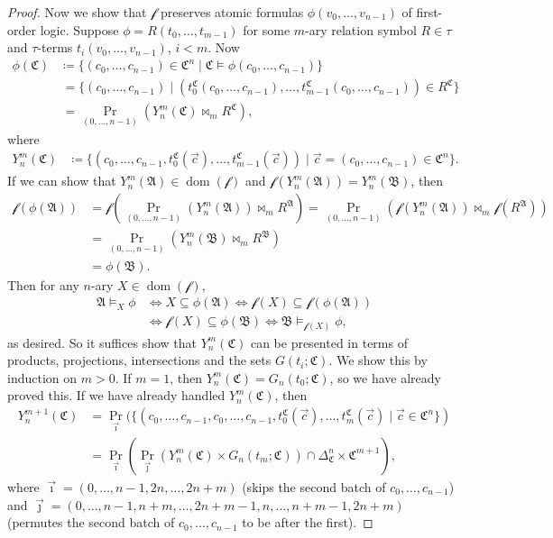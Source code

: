 \documentclass[a4paper]{amsart}
\theoremstyle{definition}
\theoremstyle{remark}
\newcommand{\A}{\mathcal{A}}
\newcommand{\B}{\mathcal{B}}
\newcommand{\C}{\mathcal{C}}
\DeclareMathOperator{\dom}{dom}
\theoremstyle{definition}
\renewcommand{\A}{\mathfrak{A}}
\renewcommand{\B}{\mathfrak{B}}
\renewcommand{\C}{\mathfrak{C}}
\newcommand{\f}{\mathcal{f}}
\begin{document}
\begin{proof}
    Now we show that $\f$ preserves atomic formulas $\phi(v_0,\dots,v_{n-1})$ of first-order logic. Suppose $\phi = R(t_0,\dots,t_{m-1})$ for some $m$-ary relation symbol $R\in\tau$ and $\tau$-terms $t_i(v_0,\dots,v_{n-1})$, $i<m$. Now
    \begin{align*}
        \phi(\C) &\coloneqq \{ (c_0,\dots,c_{n-1})\in\C^n \mid \C\models\phi(c_0,\dots,c_{n-1}) \} \\
        &\,= \{ (c_0,\dots,c_{n-1}) \mid (t_0^\C(c_0,\dots,c_{n-1}),\dots,t_{m-1}^\C(c_0,\dots,c_{n-1}))\in R^\C \} \\
        &\,= \Pr_{(0,\dots,n-1)}( Y^m_n(\C) \bowtie_m R^\C ),
    \end{align*}
    where
    \begin{align*}
        Y^m_n(\C) &\coloneqq \{ (c_0,\dots,c_{n-1},t_0^\C(\vec c),\dots,t_{m-1}^\C(\vec c)) \mid \vec c = (c_0,\dots,c_{n-1})\in\C^n \}.
    \end{align*}
    If we can show that $Y^m_n(\A)\in\dom(\f)$ and $\f(Y^m_n(\A)) = Y^m_n(\B)$, then
    \begin{align*}
        \f(\phi(\A)) &= \f\left( \Pr_{(0,\dots,n-1)}(Y^m_n(\A))\bowtie_m R^\A \right) = \Pr_{(0,\dots,n-1)}( \f(Y^m_n(\A))\bowtie_m\f(R^\A) ) \\
        &= \Pr_{(0,\dots,n-1)}(Y^m_n(\B)\bowtie_m R^\B) \\
        &= \phi(\B).
    \end{align*}
    Then for any $n$-ary $X\in\dom(\f)$,
    \begin{align*}
        \A\models_X\phi &\iff X\subseteq\phi(\A) \iff \f(X) \subseteq \f(\phi(\A)) \\
        &\iff \f(X) \subseteq\phi(\B) \iff \B\models_{\f(X)}\phi,
    \end{align*}
    as desired. So it suffices show that $Y^m_n(\C)$ can be presented in terms of products, projections, intersections and the sets $G(t_i;\C)$. We show this by induction on $m>0$. If $m=1$, then $Y^m_n(\C) = G_n(t_0;\C)$, so we have already proved this. If we have already handled $Y^m_n(\C)$, then
    \begin{align*}
        Y^{m+1}_n(\C) &= \Pr_{\vec\imath}(\{(c_0,\dots,c_{n-1},c_0,\dots,c_{n-1},t_0^\C(\vec c),\dots,t_m^\C(\vec c) \mid \vec c\in\C^n\}) \\
        &= \Pr_{\vec\imath}(\Pr_{\vec\jmath}(Y^m_n(\C)\times G_n(t_m;\C))\cap\Delta^n_\C\times\C^{m+1}),
    \end{align*}
    where $\vec\imath = (0,\dots,n-1,2n,\dots,2n+m)$ (skips the second batch of $c_0,\dots,c_{n-1}$) and $\vec\jmath = (0,\dots,n-1,n+m,\dots,2n+m-1,n,\dots,n+m-1,2n+m)$ (permutes the second batch of $c_0,\dots,c_{n-1}$ to be after the first).


\end{proof}
\end{document}
